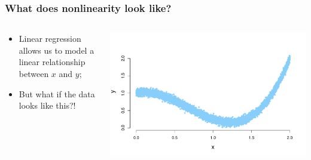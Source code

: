 \documentclass[aspectratio=169]{beamer}
\theoremstyle{principle}
\begin{document}
\begin{frame}
\frametitle{What does nonlinearity look like?}

\begin{columns}
\begin{column}{0.4\textwidth}

\begin{itemize}
\item Linear regression allows us to model a linear relationship between $x$ and $y$;
\bigskip
\bigskip
\bigskip

\item But what if the data looks like this?!

\end{itemize}

\end{column}
\begin{column}{0.6\textwidth}
\begin{center}
\includegraphics[scale=0.45]{crazy_curve_2_w_axes.pdf}
\end{center}
\end{column}
\end{columns}

\end{frame}
\end{document}
